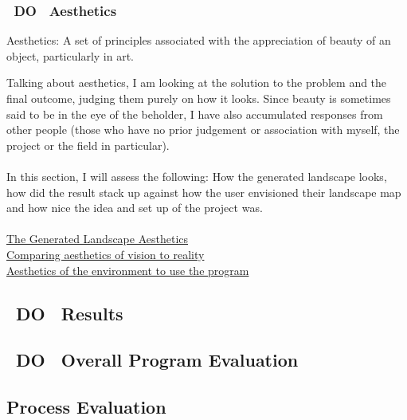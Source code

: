 \documentclass[11pt]{article}
\begin{document}
\subsubsection{~DO~ Aesthetics}
\begin{center}
	Aesthetics: A set of principles associated with the appreciation of beauty
	of an object, particularly in art. 
\end{center}

Talking about aesthetics, I am looking at the solution to the problem and
the final outcome, judging them purely on how it looks. Since beauty is 
sometimes said to be in the eye of the beholder, I have also accumulated
responses from other people (those who have no prior judgement or association
with myself, the project or the field in particular).\\
\\
In this section, I will assess the following: How the generated landscape
looks, how did the result stack up against how the user envisioned their
landscape map and how nice the idea and set up of the project was.\\
\\
\underline{The Generated Landscape Aesthetics}\\
\underline{Comparing aesthetics of vision to reality}\\
\underline{Aesthetics of the environment to use the program}\\

\subsection{~DO~ Results}

\subsection{~DO~ Overall Program Evaluation}

\subsection{Process Evaluation}
\end{document}
